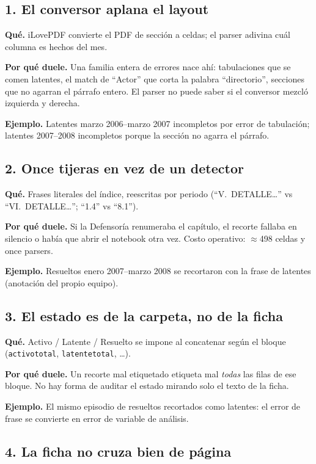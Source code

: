 \documentclass[11pt,a4paper]{article}
\begin{document}
\subsection{1. El conversor aplana el layout}

\textbf{Qué.} iLovePDF convierte el PDF de sección a celdas; el parser adivina cuál columna es hechos del mes.

\textbf{Por qué duele.} Una familia entera de errores nace ahí: tabulaciones que se comen latentes, el match de ``Actor'' que corta la palabra ``directorio'', secciones que no agarran el párrafo entero. El parser no puede saber si el conversor mezcló izquierda y derecha.

\textbf{Ejemplo.} Latentes marzo 2006--marzo 2007 incompletos por error de tabulación; latentes 2007--2008 incompletos porque la sección no agarra el párrafo.

\subsection{2. Once tijeras en vez de un detector}

\textbf{Qué.} Frases literales del índice, reescritas por periodo (``V.\ DETALLE\ldots'' vs ``VI.\ DETALLE\ldots''; ``1.4'' vs ``8.1'').

\textbf{Por qué duele.} Si la Defensoría renumeraba el capítulo, el recorte fallaba en silencio o había que abrir el notebook otra vez. Costo operativo: $\approx$498 celdas y once parsers.

\textbf{Ejemplo.} Resueltos enero 2007--marzo 2008 se recortaron con la frase de latentes (anotación del propio equipo).

\subsection{3. El estado es de la carpeta, no de la ficha}

\textbf{Qué.} Activo / Latente / Resuelto se impone al concatenar según el bloque (\texttt{activototal}, \texttt{latentetotal}, \ldots).

\textbf{Por qué duele.} Un recorte mal etiquetado etiqueta mal \emph{todas} las filas de ese bloque. No hay forma de auditar el estado mirando solo el texto de la ficha.

\textbf{Ejemplo.} El mismo episodio de resueltos recortados como latentes: el error de frase se convierte en error de variable de análisis.

\subsection{4. La ficha no cruza bien de página}
\end{document}
